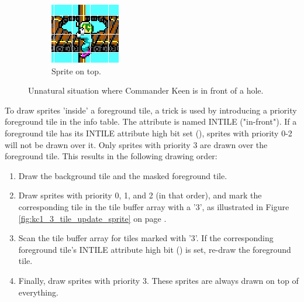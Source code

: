 \documentclass[book.tex]{subfiles}
\begin{document}
\begin{figure}[H]
\begin{subfigure}{.25\textwidth}
  \includegraphics[width=.9\textwidth]{screenshots_300dpi/game/tile_composite_3.png}
  \caption{Sprite on top.}
\end{subfigure}
\caption{Unnatural situation where Commander Keen is in front of a hole.}
\label{fig:draw_layers}
\end{figure}

\par
To draw sprites 'inside' a foreground tile, a trick is used by introducing a priority foreground tile in the  info table. The attribute is named INTILE ("in-front"). If a foreground tile has its INTILE attribute high bit set (), sprites with priority 0-2 will not be drawn over it. Only sprites with priority 3 are drawn over the foreground tile. This results in the following drawing order:
\begin{enumerate}
  \item Draw the background tile and the masked foreground tile.
  \item Draw sprites with priority 0, 1, and 2 (in that order), and mark the corresponding tile in the tile buffer array with a '3', as illustrated in Figure \ref{fig:kc1_3_tile_update_sprite} on page \pageref{fig:kc1_3_tile_update_sprite}.
  \item Scan the tile buffer array for tiles marked with '3'. If the corresponding foreground tile's INTILE attribute high bit () is set, re-draw the foreground tile. 
  \item Finally, draw sprites with priority 3. These sprites are always drawn on top of everything.
\end{enumerate}
\par
\end{document}
